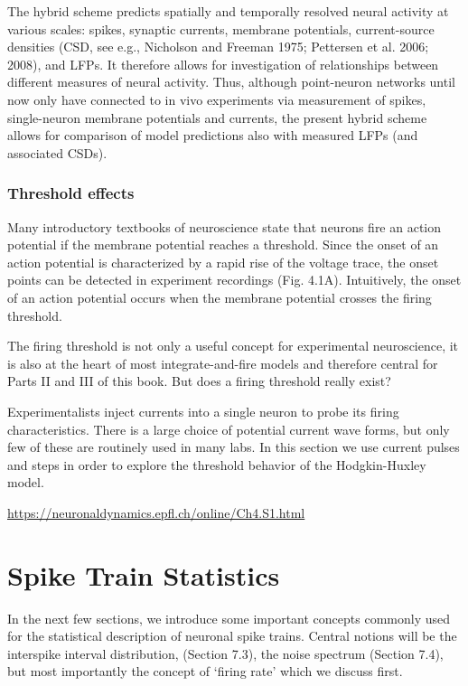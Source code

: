 The hybrid scheme predicts spatially and temporally
resolved neural activity at various scales: spikes, synaptic currents, membrane potentials, current-source densities (CSD, see
e.g., Nicholson and Freeman 1975; Pettersen et al. 2006; 2008),
and LFPs. It therefore allows for investigation of relationships
between different measures of neural activity. Thus, although
point-neuron networks until now only have connected to
in vivo experiments via measurement of spikes, single-neuron
membrane potentials and currents, the present hybrid scheme
allows for comparison of model predictions also with measured
LFPs (and associated CSDs).


\subsubsection{Threshold effects}
Many introductory textbooks of neuroscience state that neurons fire an action potential if the membrane potential reaches a threshold. Since the onset of an action potential is characterized by a rapid rise of the voltage trace, the onset points can be detected in experiment recordings (Fig. 4.1A). Intuitively, the onset of an action potential occurs when the membrane potential crosses the firing threshold.

The firing threshold is not only a useful concept for experimental neuroscience, it is also at the heart of most integrate-and-fire models and therefore central for Parts II and III of this book. But does a firing threshold really exist?

Experimentalists inject currents into a single neuron to probe its firing characteristics. There is a large choice of potential current wave forms, but only few of these are routinely used in many labs. In this section we use current pulses and steps in order to explore the threshold behavior of the Hodgkin-Huxley model.

\url{https://neuronaldynamics.epfl.ch/online/Ch4.S1.html}



\section{Spike Train Statistics}
In the next few sections, we introduce some important concepts commonly used for the statistical description of neuronal spike trains. Central notions will be the interspike interval distribution, (Section 7.3), the noise spectrum (Section 7.4), but most importantly the concept of ‘firing rate’ which we discuss first.


